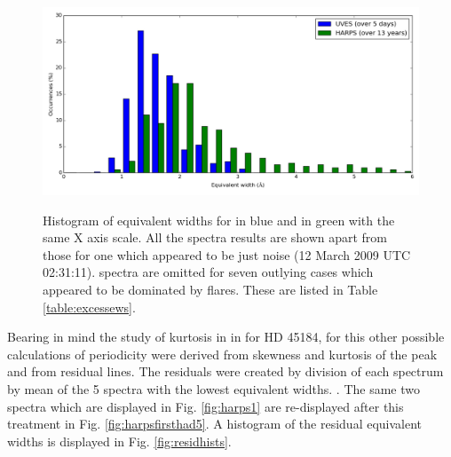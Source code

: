 \begin{figure}[!htbp]
\begin{center}
\includegraphics[scale=0.4]{Figures/proxhists.png} \\
\end{center}
\caption{Histogram of equivalent widths for {\uves} in blue and {\harps} in green with the same X axis scale. All the
  {\uves} spectra results are shown apart from those for one which appeared to be just noise (12 March 2009 UTC
  02:31:11). {\harps} spectra are omitted for seven outlying cases which appeared to be dominated by flares. These are
  listed in Table \ref{table:excessews}.}
 \protect\label{fig:proxhists}
\end{figure}

Bearing in mind the study of kurtosis in {\ha} in \citet{flores16} for HD 45184, for this {\paperorthesis} other
possible calculations of periodicity were derived from skewness and kurtosis of the {\ha} peak and from residual {\ha}
lines. The residuals were created by division of each spectrum by mean of the 5 spectra with the lowest equivalent
widths. . The same two
spectra which are displayed in Fig. \ref{fig:harps1} are re-displayed after this treatment in
Fig. \ref{fig:harpsfirsthad5}. A histogram of the residual equivalent widths is displayed in Fig. \ref{fig:residhists}.

